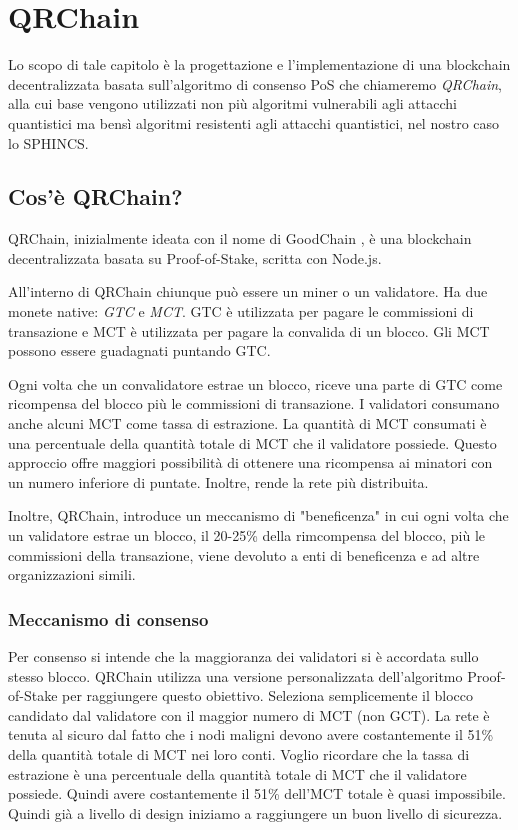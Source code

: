 \chapter{QRChain}
Lo scopo di tale capitolo è la progettazione e l'implementazione di una blockchain decentralizzata basata sull'algoritmo di consenso PoS che chiameremo \textit{QRChain}, alla cui base vengono utilizzati non più algoritmi vulnerabili agli attacchi quantistici ma bensì algoritmi resistenti agli attacchi quantistici, nel nostro caso lo SPHINCS.

\section{Cos'è QRChain?}
QRChain, inizialmente ideata con il nome di GoodChain \cite{Ghorbanzadeh_GoodChain_2022}, è una blockchain decentralizzata basata su Proof-of-Stake, scritta con Node.js.

All'interno di QRChain chiunque può essere un miner o un validatore. Ha due monete native: \textit{GTC} e \textit{MCT}. GTC è utilizzata per pagare le commissioni di transazione e MCT è utilizzata per pagare la convalida di un blocco. Gli MCT possono essere guadagnati puntando GTC.

Ogni volta che un convalidatore estrae un blocco, riceve una parte di GTC come ricompensa del blocco più le commissioni di transazione.
I validatori consumano anche alcuni MCT come tassa di estrazione. La quantità di MCT consumati è una percentuale della quantità totale di MCT che il validatore possiede.
Questo approccio offre maggiori possibilità di ottenere una ricompensa ai minatori con un numero inferiore di puntate. Inoltre, rende la rete più distribuita.

Inoltre, QRChain, introduce un meccanismo di "beneficenza" in cui ogni volta che un validatore estrae un blocco, il 20-25\% della rimcompensa del blocco, più le commissioni della transazione, viene devoluto a enti di beneficenza e ad altre organizzazioni simili.

\subsection{Meccanismo di consenso}
Per consenso si intende che la maggioranza dei validatori si è accordata sullo stesso blocco.
QRChain utilizza una versione personalizzata dell'algoritmo Proof-of-Stake per raggiungere questo obiettivo. Seleziona semplicemente il blocco candidato dal validatore con il maggior numero di MCT (non GCT).
La rete è tenuta al sicuro dal fatto che i nodi maligni devono avere costantemente il 51\% della quantità totale di MCT nei loro conti. Voglio ricordare che la tassa di estrazione è una percentuale della quantità totale di MCT che il validatore possiede. Quindi avere costantemente il 51\% dell'MCT totale è quasi impossibile. Quindi già a livello di design iniziamo a raggiungere un buon livello di sicurezza.

